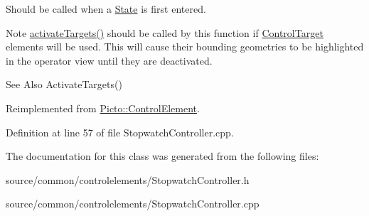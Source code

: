 Should be called when a \hyperlink{class_picto_1_1_state}{State} is first entered. \begin{DoxyNote}{Note}
\hyperlink{class_picto_1_1_control_element_ac660682acd7da329220cc7c4d7a9d825}{activate\-Targets()} should be called by this function if \hyperlink{class_picto_1_1_control_target}{Control\-Target} elements will be used. This will cause their bounding geometries to be highlighted in the operator view until they are deactivated. 
\end{DoxyNote}
\begin{DoxySeeAlso}{See Also}
Activate\-Targets() 
\end{DoxySeeAlso}


Reimplemented from \hyperlink{class_picto_1_1_control_element_a29316418d618837adeebf47bb8d58308}{Picto\-::\-Control\-Element}.



Definition at line 57 of file Stopwatch\-Controller.\-cpp.



The documentation for this class was generated from the following files\-:\begin{DoxyCompactItemize}
\item 
source/common/controlelements/Stopwatch\-Controller.\-h\item 
source/common/controlelements/Stopwatch\-Controller.\-cpp\end{DoxyCompactItemize}
